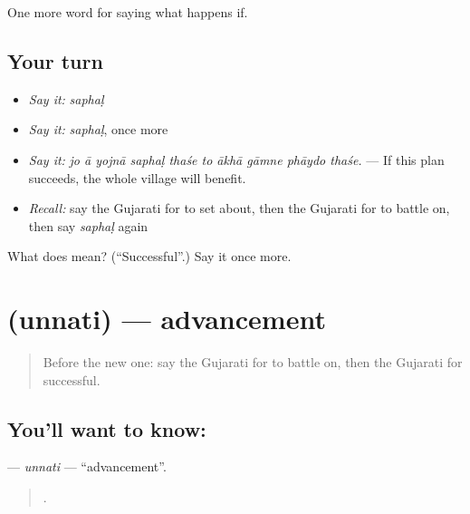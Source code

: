 \begin{grammarlens}[title={What you've built}]
One more word for saying what happens if.
\end{grammarlens}

\subsection*{Your turn}
\begin{itemize}
\raggedright
  \item \emph{Say it:} \emph{saphaḷ}
  \item \emph{Say it:} \emph{saphaḷ}, once more
  \item \emph{Say it:} \emph{jo ā yojnā saphaḷ thaśe to ākhā gāmne phāydo thaśe.} — If this plan succeeds, the whole village will benefit.
  \item \emph{Recall:} say the Gujarati for to set about, then the Gujarati for to battle on, then say \emph{saphaḷ} again
\end{itemize}

\begin{tcolorbox}[breakable,colback=teal!4,colframe=teal!35!black,title={Before you move on}]
What does  mean? (\textquotedblleft{}Successful\textquotedblright{}.) Say it once more.
\end{tcolorbox}
\section[\texorpdfstring{\gu{ઉન્નતિ} (unnati)}{ઉન્નતિ (unnati)}]{ (unnati) — advancement}

\label{lesson:GU-C384-unnati}



\begin{quote}
Before the new one: say the Gujarati for to battle on, then the Gujarati for successful.
\end{quote}

\subsection*{You'll want to know: }
\textbf{} — \emph{unnati} — \textquotedblleft{}advancement\textquotedblright{}.

\begin{quote}
         .
\end{quote}

